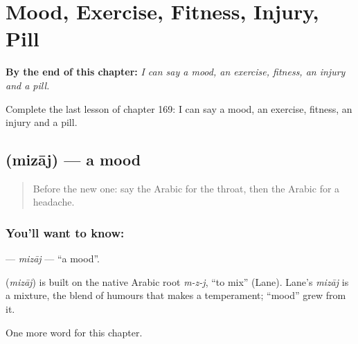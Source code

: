 
\chapter{Mood, Exercise, Fitness, Injury, Pill}
\label{ch:ar-mood-exercise-fitness-injury-pill}

\begin{chapteropening}
\textbf{By the end of this chapter:} \emph{I can say a mood, an exercise, fitness, an injury and a pill.}

Complete the last lesson of chapter 169: I can say a mood, an exercise, fitness, an injury and a pill.
\end{chapteropening}

\section[\texorpdfstring{\ar{مزاج} (mizāj)}{مزاج (mizāj)}]{ (mizāj) — a mood}

\label{lesson:AR-C169-mizaj}



\begin{quote}
Before the new one: say the Arabic for the throat, then the Arabic for a headache.
\end{quote}

\subsection*{You'll want to know: }
\textbf{} — \emph{mizāj} — \textquotedblleft{}a mood\textquotedblright{}.

\begin{cousinweb}
\textbf{} (\emph{mizāj}) is built on the native Arabic root \emph{m-z-j}, \textquotedblleft{}to mix\textquotedblright{} (Lane). Lane's \emph{mizāj} is a mixture, the blend of humours that makes a temperament; \textquotedblleft{}mood\textquotedblright{} grew from it.
\end{cousinweb}

\begin{grammarlens}[title={What you've built}]
One more word for this chapter.
\end{grammarlens}

